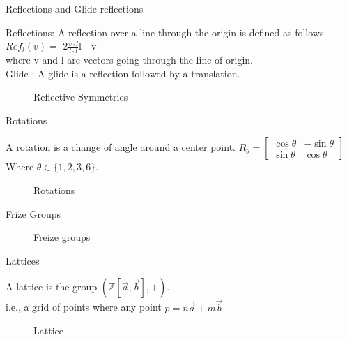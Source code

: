 \documentclass{beamer}
\theoremstyle{definition}
\begin{document}
\begin{frame}{Reflections and Glide reflections}
    \begin{definition}
        Reflections: A reflection over a line through the origin is defined as follows\\
        $Ref_l(v) =$ \(2\frac{v \cdot l}{l \cdot l}\)l - v\\ where v and l are vectors going through the line of origin.\\ 
        Glide : A glide is a reflection followed by a translation.  \cite{Angela:2023}
    \end{definition}
    \begin{figure}
        \centering
        
        \caption{Reflective Symmetries}
        \label{fig:symmetries}
    \end{figure}
\end{frame}

\begin{frame}{Rotations}
    \begin{definition}
        A rotation is a change of angle around a center point.
        $R_\theta = \begin{bmatrix}
            \cos\theta & -\sin\theta\\
            \sin\theta & \cos\theta
        \end{bmatrix}$ 
        Where $\theta \in \{1,2,3,6\}.$ \cite{Angela:2023}
    \end{definition}
    \begin{figure}
        \centering
        
        \caption{Rotations}
        \label{fig:enter-label}
    \end{figure}
\end{frame}

\begin{frame}{Frize Groups}
    \begin{figure}
        \centering
        
        \caption{Freize groups}
        \label{fig:Freize}
    \end{figure}
\end{frame}

\begin{frame}{Lattices}
    \begin{definition}
        A lattice is the group $(\mathbb{Z}[\Vec{a},\Vec{b}],+).$\\
        i.e., a grid of points where any point $p = n\Vec{a} +m\Vec{b}$ 
    \end{definition}
    \begin{figure}
        \centering
        \scalebox{0.5}{}
        \caption{Lattice}
        \label{fig:enter-label}
    \end{figure}
\end{frame}
\end{document}
